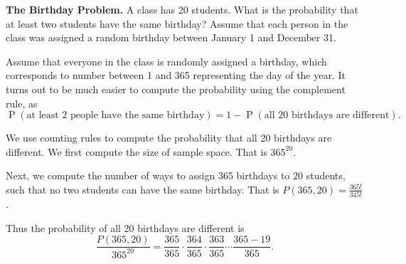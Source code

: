 \documentclass[11pt]{exam}
\DeclareMathOperator*{\Prob}{P}
\renewcommand{\Pr}{\Prob}
\begin{document}
\begin{questions}
\newpage
\question \textbf{The Birthday Problem.} A class has 20 students.  What is the probability that at least
two students have the same birthday?  Assume that each person in the class was
assigned a random birthday between January 1 and December 31.

\begin{solution}
Assume that everyone in the class is randomly assigned a birthday, which
corresponds to number between 1 and 365 representing the day of the year.
It turns out to be much easier to compute the probability using the complement
rule, as
\[
  \Pr(\text{at least 2 people have the same birthday})
  = 1 - \Pr(\text{all 20 birthdays are different}).
\]

We use counting rules to compute the probability that all 20 birthdays are different. 
We first compute the size of sample space. That is $365^{20}$.

Next, we compute the number of ways to assign 365 birthdays to 20 students, such that no two students can have the same birthday.
That is $P(365,20)=\frac{365!}{345!}$.

Thus the probability of all 20 birthdays are different is
$$\frac{P(365,20)}{365^{20}} = \frac{365}{365}\cdot \frac{364}{365}\cdot\frac{363}{365}\cdots \frac{365-19}{365}.$$

\end{solution}





\end{questions}
\end{document}
